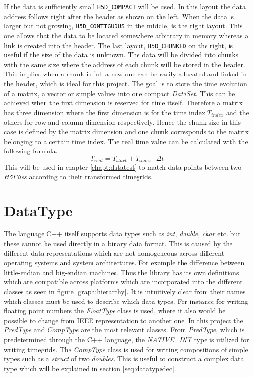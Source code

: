 If the data is sufficiently small \texttt{H5D\_COMPACT} will be used. In this layout the data address follows right after the header as shown on the left. When the data is larger but not growing, \texttt{H5D\_CONTIGUOUS} in the middle, is the right layout. This one allows that the data to be located somewhere arbitrary in memory whereas a link is created into the header. The last layout, \texttt{H5D\_CHUNKED} on the right, is useful if the size of the data is unknown. The data will be divided into chunks with the same size where the address of each chunk will be stored in the header. This implies when a chunk is full a new one can be easily allocated and linked in the header, which is ideal for this project.
The goal is to store the time evolution of a matrix, a vector or simple values into one compact \textit{DataSet}. This can be achieved when the first dimension is reserved for time itself. Therefore a matrix has three dimension where the first dimension is for the time index $T_{index}$ and the others for row and column dimension respectively. Hence the chunk size in this case is defined by the matrix dimension and one chunk corresponds to the matrix belonging to a certain time index. The real time value can be calculated with the following formula:
\begin{equation}
\label{eq:mapping}
 T_{real} = T_{start} + T_{index} \cdot \Delta t
\end{equation}
This will be used in chapter \ref{chapt:datatest} to match data points between two \textit{H5Files} according to their transformed timegrids.

\section{DataType}
\label{seq:datatype}
The language C++ itself supports data types such as \emph{int}, \emph{double}, \emph{char} etc. but these cannot be used directly in a binary data format.
This is caused by the different data representations which are not homogeneous across different operating systems and system architectures. For example the difference between little-endian and big-endian machines. Thus the library has its own definitions which are compatible across platforms which are incorporated into the different classes as seen in figure \ref{graph:hierarchy}. It is intuitively clear from their names which classes must be used to describe which data types. For instance for writing floating point numbers the \textit{FloatType} class is used, where it also would be possible to change from IEEE representation to another one. In this project the \textit{PredType} and \textit{CompType} are the most relevant classes. From \textit{PredType}, which is predetermined through the C++ language, the \textit{NATIVE\_INT} type is utilized for writing timegrids. The \textit{CompType} class is used for
writing compositions of simple types such as a \textit{struct} of two \textit{doubles}. This is useful to construct a complex data type which will be explained in section \ref{seq:datatypedec}.

